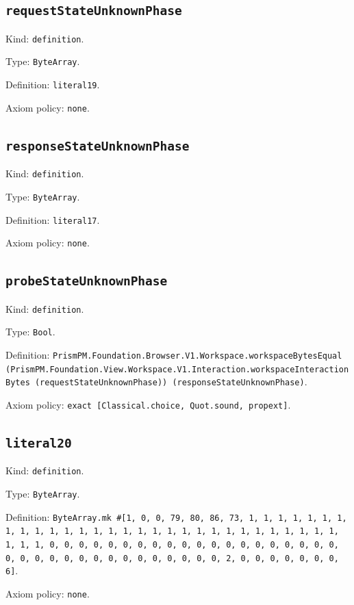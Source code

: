 \documentclass[11pt]{article}
\begin{document}
\subsection*{\texttt{requestStateUnknownPhase}}
\noindent Kind: \texttt{definition}.\par
\noindent Type: \texttt{ByteArray}.\par
\noindent Definition: \texttt{literal19}.\par
\noindent Axiom policy: \texttt{none}.\par
\subsection*{\texttt{responseStateUnknownPhase}}
\noindent Kind: \texttt{definition}.\par
\noindent Type: \texttt{ByteArray}.\par
\noindent Definition: \texttt{literal17}.\par
\noindent Axiom policy: \texttt{none}.\par
\subsection*{\texttt{probeStateUnknownPhase}}
\noindent Kind: \texttt{definition}.\par
\noindent Type: \texttt{Bool}.\par
\noindent Definition: \texttt{PrismPM.Foundation.Browser.V1.Workspace.workspaceBytesEqual (PrismPM.Foundation.View.Workspace.V1.Interaction.workspaceInteractionBytes (requestStateUnknownPhase)) (responseStateUnknownPhase)}.\par
\noindent Axiom policy: \texttt{exact [Classical.choice, Quot.sound, propext]}.\par
\subsection*{\texttt{literal20}}
\noindent Kind: \texttt{definition}.\par
\noindent Type: \texttt{ByteArray}.\par
\noindent Definition: \texttt{ByteArray.mk \#[1, 0, 0, 79, 80, 86, 73, 1, 1, 1, 1, 1, 1, 1, 1, 1, 1, 1, 1, 1, 1, 1, 1, 1, 1, 1, 1, 1, 1, 1, 1, 1, 1, 1, 1, 1, 1, 1, 1, 1, 0, 0, 0, 0, 0, 0, 0, 0, 0, 0, 0, 0, 0, 0, 0, 0, 0, 0, 0, 0, 0, 0, 0, 0, 0, 0, 0, 0, 0, 0, 0, 0, 0, 0, 0, 2, 0, 0, 0, 0, 0, 0, 0, 6]}.\par
\noindent Axiom policy: \texttt{none}.\par
\end{document}
